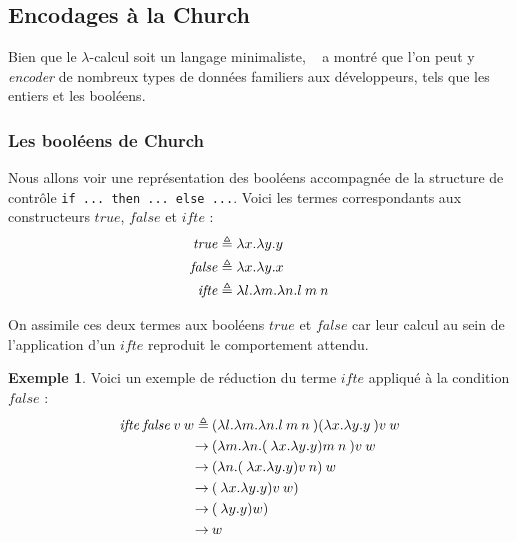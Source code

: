 \documentclass {article}
\theoremstyle{definition}
\newtheorem{example}{Exemple}
\theoremstyle{remark}
\begin{document}
\subsection{Encodages à la Church}

Bien que le $\lambda$-calcul soit un langage minimaliste, ~\citet{church:lambda-calcul} a montré que l'on peut
y \emph{encoder} de nombreux types de données familiers aux développeurs, tels que
les entiers et les booléens.


\subsubsection{Les booléens de Church}
\label{church-bool}

\newcommand{\True}{\ensuremath{\mathit{true}}}
\newcommand{\False}{\ensuremath{\mathit{false}}}
\newcommand{\Ifte}{\ensuremath{\mathit{ifte}}}

Nous allons voir une représentation des booléens accompagnée de la 
structure de contrôle \texttt{if ... then ... else ...}.
Voici les termes correspondants aux constructeurs \True{}, \False{} et 
\Ifte{} :
\begin{align*}
  \True &\triangleq  \Lam{x}{\Lam{y}{\Var{y}}} \\
  \False &\triangleq \Lam{x}{\Lam{y}{\Var{x}}} \\
  \Ifte &\triangleq \Lam{l}{\Lam{m}{\Lam{n}{\App{\Var{l}}{\App{\Var{m}}{\Var{n}}}}}}  \\
\end{align*}

On assimile ces deux termes aux booléens \True{} et \False{} car leur calcul au sein
de l'application d'un \Ifte{} reproduit le comportement attendu.

\begin{example}
  Voici un exemple de réduction du terme \Ifte{} appliqué à la condition \False{} :
  \begin{align*}
    \App{\App{\App{\Ifte}{\False{}}}{\Var{v}}}{\Var{w}}  \triangleq&\: \App{\App{\App{(\Lam{l}{\Lam{m}{\Lam{n}{\App{\App{l}{m}}{n}}}}})({\Lam{x}{\Lam{y}{y}}}}){v}}{w} \\
    \rightarrow &\: \App{\App{({\Lam{m}{\Lam{n}{\App{\App({\Lam{x}{\Lam{y}{y}}}){m}}{n}}}}}){v}}{w} \\
    \rightarrow &\: \App{(\Lam{n}{\App{\App({\Lam{x}{\Lam{y}{y}}}){v}}{n}})}{w} \\
    \rightarrow &\: \App{\App({\Lam{x}{\Lam{y}{y}}}){v}}{w}) \\
    \rightarrow &\: \App({\Lam{y}{y}}){w}) \\
    \rightarrow &\: \Var{w}
  \end{align*}
\end{example}
\end{document}
